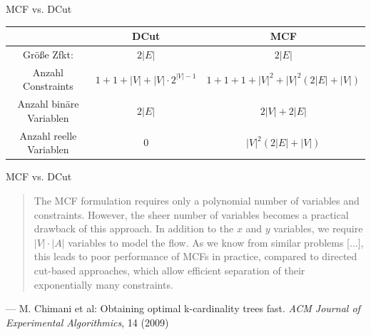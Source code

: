 \documentclass[ngerman,aspectratio=169,10pt]{beamer}
\begin{document}
\begin{frame}{MCF vs. DCut}
\begin{tabular}{c|c|c}\hline
   & DCut  & MCF \\\hline
Größe Zfkt: & $2|E|$ & $2|E|$ \\\hline
Anzahl Constraints & $1+1+|V|+|V|\cdot2^{|V|-1}$ & $1+1+1+|V|^2+|V|^2(2|E|+|V|)$ \\\hline
Anzahl binäre Variablen & $2|E|$ & $2|V|+2|E|$ \\\hline
Anzahl reelle Variablen & $0$ & $|V|^2(2|E|+|V|)$\\\hline
\end{tabular}
\end{frame}

\begin{frame}{MCF vs. DCut}
\begin{quote}
The MCF formulation requires only a polynomial number of variables and constraints. However, the sheer number of variables becomes a practical drawback of this approach. In addition to the $x$ and $y$ variables, we require $|V|\cdot|A|$ variables to model the flow. As we know from similar problems [...], this leads to poor performance of MCFs in practice, compared to directed cut-based approaches, which allow efficient separation of their exponentially many constraints.
\end{quote}
\begin{flushright}
--- M. Chimani et al: Obtaining optimal k-cardinality trees fast. \textit{ACM Journal of Experimental Algorithmics}, 14 (2009)
\end{flushright}
\end{frame}
\end{document}
